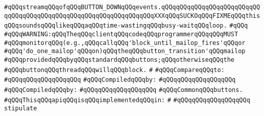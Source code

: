 \verb|#qQQqstreamqQQqofqQQqBUTTON_DOWNqQQqevents.qQQqqQQqqQQqqQQqqQQqqQQqqQQqqQQqqQQqqQQqqQQqqQQqqQQqqQQqqQQqqQQqqQQqXXXqQQqSUCKOqQQqFIXMEqQQqthisqQQqsoundsqQQqlikeqQQqaqQQqtime-wastingqQQqbusy-waitqQQqloop.|\newline
\verb|#qQQq|\newline
\verb|#qQQqWARNING:qQQqTheqQQqclientqQQqcodeqQQqprogrammerqQQqqQQqMUST|\newline
\verb|#qQQqmonitorqQQq(e.g.,qQQqcallqQQq'block_until_mailop_fires'qQQqor|\newline
\verb|#qQQq'do_one_mailop'qQQqon)qQQqtheqQQqbutton_transition'qQQqmailop|\newline
\verb|#qQQqprovidedqQQqbyqQQqstandardqQQqbuttons;qQQqotherwiseqQQqthe|\newline
\verb|#qQQqbuttonqQQqthreadqQQqwillqQQqblock.|\newline
\verb|#|\newline
\verb|#qQQqCompareqQQqto:|\newline
\verb|#qQQqqQQqqQQqqQQqqQQq|\newline
\newline
\verb|#qQQqCompiledqQQqby:|\newline
\verb|#qQQqqQQqqQQqqQQqqQQq|\newline
\newline
\newline
\verb|#qQQqCompiledqQQqby:|\newline
\verb|#qQQqqQQqqQQqqQQqqQQq|\newline
\newline
\newline
\newline
\newline
\verb|#qQQqCommonqQQqbuttons.|\newline
\newline
\verb|#qQQqThisqQQqapiqQQqisqQQqimplementedqQQqin:|\newline
\verb|#|\newline
\verb|#qQQqqQQqqQQqqQQqqQQq|\newline
\newline
\verb|stipulate|\newline
